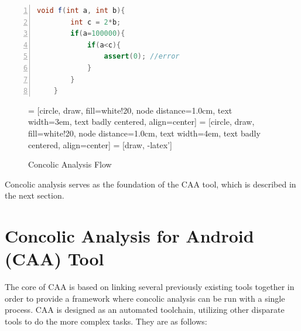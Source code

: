 \documentclass{sig-alternate}
\newcommand{\sam}[1]{\textcolor{red}{{\it [Sam says: #1]}}}
\newcommand{\dan}[1]{\textcolor{blue}{{\it [Dan says: #1]}}}
\begin{document}
\begin{lstlisting}[label=lst:RawCodeToHaveCAAOnIt, caption=Code to be examined by Concolic Analysis, language=Java, numbers=left]
	void f(int a, int b){
		int c = 2*b;
		if(a=100000){
			if(a<c){
				assert(0); //error
			}
		}
	}
\end{lstlisting}




\begin{figure}[h] %

\begin{center}
 = [circle, draw, fill=white!20, node distance=1.0cm, text width=3em, text badly centered, align=center]
 = [circle, draw, fill=white!20, node distance=1.0cm, text width=4em, text badly centered, align=center]
 = [draw, -latex']

\caption{Concolic Analysis Flow}
\label{fig:CAAAnalysisFlow}
\end{center}
\end{figure}

Concolic analysis serves as the foundation of the CAA tool, which is described in the next section. 


\section{Concolic Analysis for Android (CAA) Tool}
\label{sec: caa}

The core of CAA is based on linking several previously existing tools together in order to provide a framework where concolic analysis can be run with a single process. CAA is designed as an automated toolchain, utilizing other disparate tools to do the more complex tasks. They are as follows:
\end{document}
